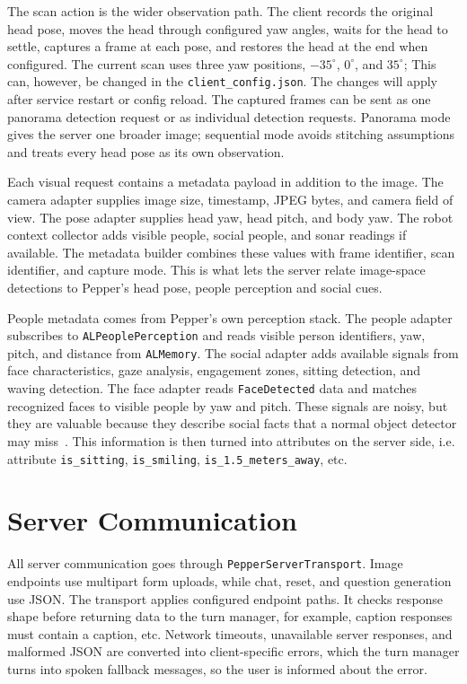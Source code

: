 The scan action is the wider observation path. The client records the original head pose, moves the head through configured yaw angles, waits for the head to settle, captures a frame at each pose, and restores the head at the end when configured. The current scan uses three yaw positions, \(-35^\circ\), \(0^\circ\), and \(35^\circ\); This can, however, be changed in the \texttt{client\_config.json}. The changes will apply after service restart or config reload. The captured frames can be sent as one panorama detection request or as individual detection requests. Panorama mode gives the server one broader image; sequential mode avoids stitching assumptions and treats every head pose as its own observation.

Each visual request contains a metadata payload in addition to the image. The camera adapter supplies image size, timestamp, JPEG bytes, and camera field of view. The pose adapter supplies head yaw, head pitch, and body yaw. The robot context collector adds visible people, social people, and sonar readings if available. The metadata builder combines these values with frame identifier, scan identifier, and capture mode. This is what lets the server relate image-space detections to Pepper's head pose, people perception and social cues.

People metadata comes from Pepper's own perception stack. The people adapter subscribes to \texttt{ALPeoplePerception} and reads visible person identifiers, yaw, pitch, and distance from \texttt{ALMemory}. The social adapter adds available signals from face characteristics, gaze analysis, engagement zones, sitting detection, and waving detection. The face adapter reads \texttt{FaceDetected} data and matches recognized faces to visible people by yaw and pitch. These signals are noisy, but they are valuable because they describe social facts that a normal object detector may miss~\cite{softbank_alspeechrecognition_2026}. This information is then turned into attributes on the server side, i.e. attribute \texttt{is\_sitting}, \texttt{is\_smiling}, \texttt{is\_1.5\_meters\_away}, etc.

\section{Server Communication}\label{sec:client-transport-state}

All server communication goes through \texttt{PepperServerTransport}. Image endpoints use multipart form uploads, while chat, reset, and question generation use JSON. The transport applies configured endpoint paths. It checks response shape before returning data to the turn manager, for example, caption responses must contain a caption, etc. Network timeouts, unavailable server responses, and malformed JSON are converted into client-specific errors, which the turn manager turns into spoken fallback messages, so the user is informed about the error.

